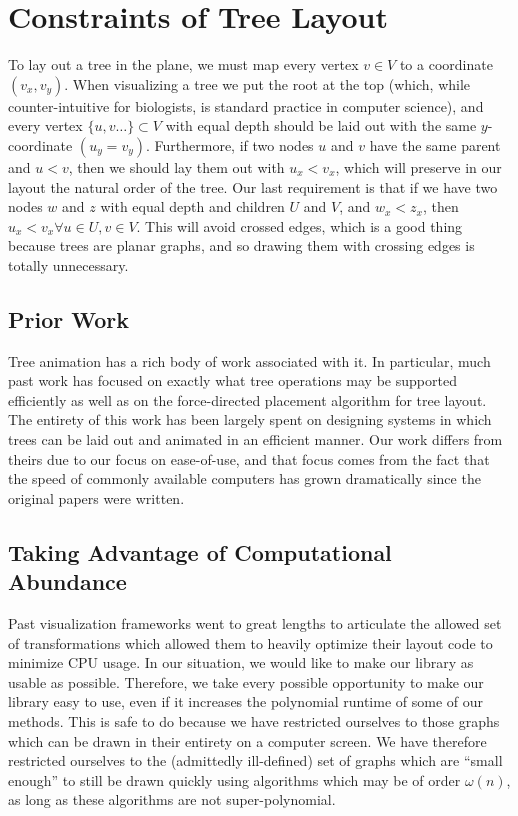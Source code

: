 \documentclass{article}
\begin{document}
\section{Constraints of Tree Layout}
\label{sec:constraints}
To lay out a tree in the plane, we must map every vertex $v \in V$ to a
coordinate $(v_x, v_y)$.  When visualizing a tree we put the root at the top
(which, while counter-intuitive for biologists, is standard practice in
computer science), and every vertex $\{u,v \ldots\} \subset V$ with equal depth
should be laid out with the same $y$-coordinate $(u_y = v_y)$.  Furthermore, if
two nodes $u$ and $v$ have the same parent and $u < v$, then we should lay them
out with $u_x < v_x$, which will preserve in our layout the natural order of the tree.  Our last requirement is that if we have two nodes $w$ and $z$ with equal depth and children $U$ and $V$, and $w_x < z_x$, then $u_x < v_x \forall u\in U, v\in V$.  This will avoid crossed edges, which is a good thing because trees are planar graphs, and so drawing them with crossing edges is totally unnecessary.

\subsection{Prior Work}

Tree animation has a rich body of work associated with it.  In particular, much
past work has focused on exactly what tree operations may be supported
efficiently\cite{Moen,tamassia} as well as on the force-directed placement
algorithm for tree layout\cite{fdp, Cohen}.  The entirety of this work has been
largely spent on designing systems in which trees can be laid out and animated
in an efficient manner.  Our work differs from theirs due to our focus on
ease-of-use, and that focus comes from the fact that the speed of commonly
available computers has grown dramatically since the original papers were
written.

\subsection{Taking Advantage of Computational Abundance}

Past visualization frameworks went to great lengths to articulate the allowed
set of transformations which allowed them to heavily optimize their layout code
to minimize CPU usage.  In our situation, we would like to make our library as
usable as possible.  Therefore, we take every possible opportunity to make our
library easy to use, even if it increases the polynomial runtime of some of our
methods.  This is safe to do because we have restricted ourselves to those
graphs which can be drawn in their entirety on a computer screen.  We have
therefore restricted ourselves to the (admittedly ill-defined) set of graphs
which are ``small enough'' to still be drawn quickly using algorithms which may
be of order $\omega(n)$, as long as these algorithms are not super-polynomial.
\end{document}
